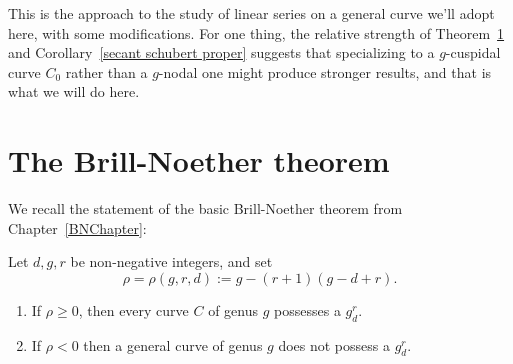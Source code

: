 This is the approach to the study of linear series on a general curve we'll adopt here, with some modifications. For one thing, the relative strength of Theorem~\ref{} and Corollary~\ref{secant schubert proper} suggests that specializing to a $g$-cuspidal curve $C_0$ rather than a $g$-nodal one might produce stronger results, and that is what we will do here.


\section{The Brill-Noether theorem}

We recall the statement of the basic Brill-Noether theorem from Chapter~\ref{BNChapter}:

\begin{theorem}\label{basic Brill Noether}
Let $d,g,r$ be non-negative integers, and set 
$$
\rho =\rho(g,r,d) := g - (r+1)(g-d+r).
$$
 \begin{enumerate}
\item If $\rho \geq 0$, then every curve $C$ of genus $g$ possesses a $g^r_d$.
\item If $\rho < 0$ then a general curve of genus $g$ does not possess a $g^r_d$.
\end{enumerate}
\end{theorem}

